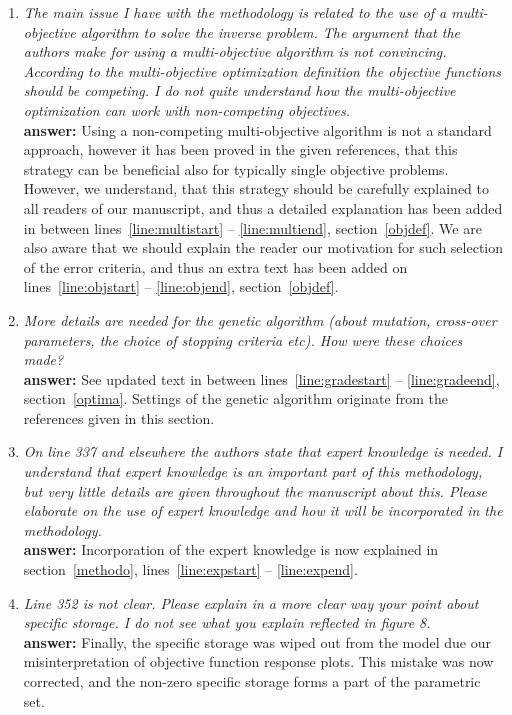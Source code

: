 \documentclass[final,3p]{elsarticle}
\begin{document}
\begin{enumerate}
\item {\it  The main issue I have with the methodology is related to the use of a multi-objective algorithm to solve the inverse problem. The argument that the authors make for using a multi-objective algorithm is not convincing. According to the multi-objective optimization definition the objective functions should be competing. I do not quite understand how the multi-objective optimization can work with non-competing objectives.} \\ 
{\bf  answer:} Using a non-competing multi-objective algorithm is not a standard approach, however it has been proved in the given references, that this strategy can be beneficial also for typically single objective problems. However, we understand, that this strategy should be carefully explained to all readers of our manuscript, and thus a detailed explanation has been added in between lines~\ref{line:multistart} -- \ref{line:multiend}, section~\ref{objdef}. We are also aware that we should explain the reader our motivation for such selection of the error criteria, and thus an extra text has been added on lines~\ref{line:objstart} -- \ref{line:objend}, section~\ref{objdef}.

\item {\it   More details are needed for the genetic algorithm (about mutation, cross-over parameters, the choice of stopping criteria etc). How were these choices made?} \\
{\bf  answer:} See updated text in between lines~\ref{line:gradestart} -- \ref{line:gradeend}, section~\ref{optima}. Settings of the genetic algorithm originate from the references given in this section.

\item {\it On line 337 and elsewhere the authors state that expert knowledge is needed.  I understand that expert knowledge is an important part of this methodology, but very little details are given throughout the manuscript about this. Please elaborate on the use of expert knowledge and how it will be incorporated in the methodology.} \\
{\bf  answer:} Incorporation of the expert knowledge is now explained in section~\ref{methodo}, lines~\ref{line:expstart} -- \ref{line:expend}.

\item {\it  Line 352 is not clear. Please explain in a more clear way your point about specific storage. I do not see what you explain reflected in figure 8.} \\ 
{\bf  answer:} Finally, the specific storage was wiped out from the model due our misinterpretation of objective function response plots. This mistake was now corrected, and the non-zero specific storage forms a part of the parametric set.

\end{enumerate}
\end{document}
